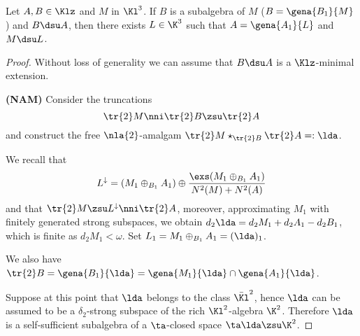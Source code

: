 \begin{lem}
Let $A,B\in\Klz$ and $M$ in $\Kl^{3}$. If $B$ is a subalgebra of $M$ ($B=\gena{B_{1}}{M}$) and $B\dsu A$, %
then there exists $L\in\K^{3}$ such that
$A=\gena{A_{1}}{L}$ and $M\dsu L$.
\end{lem}

\begin{proof}
Without loss of generality we can assume that $B\dsu A$ is a $\Klz$-minimal extension.



\bigskip
{\bf (NAM)} %
Consider the truncations
$$\tr{2}M\nni\tr{2}B\zsu\tr{2}A$$ and
construct the free $\nla{2}$-amalgam $\tr{2}M\star_{\tr{2}B}\tr{2}A=:\lda$.

We recall that
$$
L^{\downarrow}=\left(M_{1}\oplus_{B_{1}}A_{1}\right)\oplus
\frac{\exs(M_{1}\oplus_{B_{1}}A_{1})}{N^{2}(M)+N^{2}(A)}
$$
and that $\tr{2}M\zsu L^{\downarrow}\nni\tr{2}A$, moreover, approximating $M_{1}$ with finitely
generated strong subspaces, we obtain $d_{2}\lda=d_{2}M_{1}+d_{2}A_{1}-d_{2}B_{1}$, which is
finite as $d_{2}M_{1}<\omega$. Set $L_{1}=M_{1}\oplus_{B_{1}}A_{1}=(\lda)_{1}$.

We also have $\tr{2}B=\gena{B_{1}}{\lda}=\gena{M_{1}}{\lda}\cap\gena{A_{1}}{\lda}$.

\medskip
Suppose at this point that $\lda$ belongs to the class $\bar{\Kl}^{2}$, hence $\lda$ can be assumed to
be a $\delta_{2}$-strong
subspace of the rich $\Kl^{2}$-algebra $\K^{2}$. Therefore $\lda$ is a self-sufficient subalgebra
of a $\ta$-closed space $\ta\lda\zsu\K^{2}$.


\end{proof}
